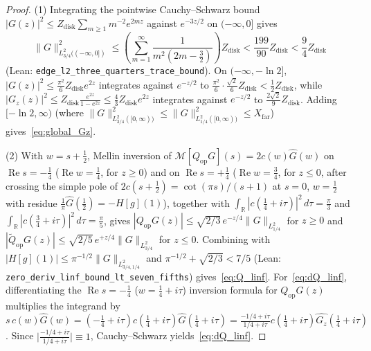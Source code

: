 \documentclass[11pt,a4paper]{article}
\begin{document}
\begin{proof}
(1) Integrating the pointwise Cauchy--Schwarz bound $|G(z)|^2\le Z_{\mathrm{disk}}\sum_{m\ge 1} m^{-2}e^{2mz}$
against $e^{-3z/2}$ on $(-\infty,0]$ gives
\[
\|G\|_{L^2_{3/4}((-\infty,0])}^2
\le \left(\sum_{m=1}^\infty\frac{1}{m^2(2m-\tfrac32)}\right)Z_{\mathrm{disk}}
< \frac{199}{90}Z_{\mathrm{disk}} < \frac{9}{4}Z_{\mathrm{disk}}
\]
(Lean: \texttt{edge\_l2\_three\_quarters\_trace\_bound}).
On $(-\infty,-\ln 2]$, $|G(z)|^2\le\frac{\pi^2}{6}Z_{\mathrm{disk}}e^{2z}$ integrates against $e^{-z/2}$ to
$\frac{\pi^2}{6}\cdot\frac{\sqrt{2}}{6}Z_{\mathrm{disk}}<\frac{1}{2}Z_{\mathrm{disk}}$, while
$|G_z(z)|^2\le Z_{\mathrm{disk}}\frac{e^{2z}}{1-e^{2z}}\le\frac{4}{3}Z_{\mathrm{disk}}e^{2z}$ integrates against $e^{-z/2}$ to
$\frac{2\sqrt{2}}{9}Z_{\mathrm{disk}}$.
Adding $[-\ln 2,\infty)$ (where $\|G\|_{L^2_{3/4}([0,\infty))}^2\le\|G\|_{L^2_{1/4}([0,\infty))}^2\le X_{\mathrm{far}}$)
gives~\eqref{eq:global_Gz}.

(2) With $w=s+\tfrac12$, Mellin inversion of $\mathcal{M}[Q_{\mathrm{op}}G](s)=2c(w)\widehat{G}(w)$ on
$\operatorname{Re}s=-\tfrac14$ ($\operatorname{Re}w=\tfrac14$, for $z\ge 0$) and on
$\operatorname{Re}s=+\tfrac14$ ($\operatorname{Re}w=\tfrac34$, for $z\le 0$, after crossing the simple pole of
$2c(s+\tfrac12)=\cot(\pi s)/(s+1)$ at $s=0$, $w=\tfrac12$ with residue $\frac{1}{\pi}\widehat{G}(\tfrac12)=-H[g](1)$),
together with $\int_{\mathbb{R}}|c(\tfrac14+i\tau)|^2\,d\tau=\frac{\pi}{3}$ and
$\int_{\mathbb{R}}|c(\tfrac34+i\tau)|^2\,d\tau=\frac{\pi}{5}$, gives
$|Q_{\mathrm{op}}G(z)|\le\sqrt{2/3}\,e^{-z/4}\|G\|_{L^2_{1/4}}$ for $z\ge 0$ and
$|\widetilde{Q}_{\mathrm{op}}G(z)|\le\sqrt{2/5}\,e^{+z/4}\|G\|_{L^2_{3/4}}$ for $z\le 0$.
Combining with $|H[g](1)|\le\pi^{-1/2}\|G\|_{L^2_{3/4,1/4}}$ and $\pi^{-1/2}+\sqrt{2/3}<7/5$
(Lean: \texttt{zero\_deriv\_linf\_bound\_lt\_seven\_fifths}) gives~\eqref{eq:Q_linf}.
For~\eqref{eq:dQ_linf}, differentiating the $\operatorname{Re}s=-\tfrac14$ ($w=\tfrac14+i\tau$) inversion formula for
$Q_{\mathrm{op}}G(z)$ multiplies the integrand by
$s\,c(w)\widehat{G}(w)=(-\tfrac14+i\tau)c(\tfrac14+i\tau)\widehat{G}(\tfrac14+i\tau)
=\frac{-1/4+i\tau}{1/4+i\tau}c(\tfrac14+i\tau)\widehat{G_z}(\tfrac14+i\tau)$.
Since $\bigl|\frac{-1/4+i\tau}{1/4+i\tau}\bigr|\equiv 1$, Cauchy--Schwarz yields~\eqref{eq:dQ_linf}.


\end{proof}
\end{document}
